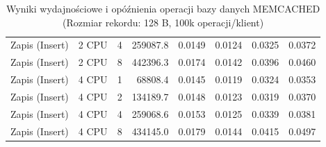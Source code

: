 \begin{table}[ht]
{\begin{tabular}{llcrrrrr}
Zapis (Insert) & 2 CPU & 4 & 259087.8 & 0.0149 & 0.0124 & 0.0325 & 0.0372 \\
Zapis (Insert) & 2 CPU & 8 & 442396.3 & 0.0174 & 0.0142 & 0.0396 & 0.0460 \\
Zapis (Insert) & 4 CPU & 1 & 68808.4 & 0.0145 & 0.0119 & 0.0324 & 0.0353 \\
Zapis (Insert) & 4 CPU & 2 & 134189.7 & 0.0148 & 0.0123 & 0.0319 & 0.0370 \\
Zapis (Insert) & 4 CPU & 4 & 259068.6 & 0.0153 & 0.0125 & 0.0339 & 0.0381 \\
Zapis (Insert) & 4 CPU & 8 & 434145.0 & 0.0179 & 0.0144 & 0.0415 & 0.0497 \\
\bottomrule
\end{tabular}%
}
\caption{Wyniki wydajnościowe i opóźnienia operacji bazy danych MEMCACHED (Rozmiar rekordu: 128 B, 100k operacji/klient)}
\label{tab:latency_memcached_small_100000}
\end{table}
